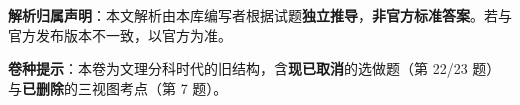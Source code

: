 

\begin{gknotice}
\textbf{ 解析归属声明}：本文解析由本库编写者根据试题\textbf{独立推导}，\textbf{非官方标准答案}。若与官方发布版本不一致，以官方为准。

\textbf{ 卷种提示}：本卷为文理分科时代的旧结构，含\textbf{现已取消}的选做题（第 22/23 题）与\textbf{已删除}的三视图考点（第 7 题）。
\end{gknotice}

\par\medskip


